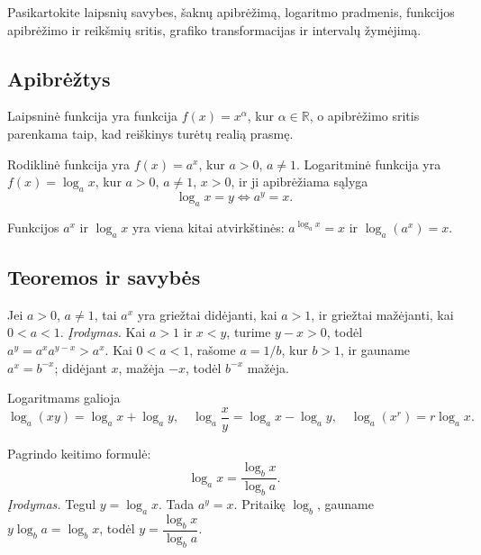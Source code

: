 \begin{tcolorbox}[title=Prieš pradedant, colback=green!5]
Pasikartokite laipsnių savybes, šaknų apibrėžimą, logaritmo pradmenis, funkcijos apibrėžimo ir reikšmių sritis, grafiko transformacijas ir intervalų žymėjimą.
\end{tcolorbox}
\subsection{Apibrėžtys}

\begin{apibreztis}
Laipsninė funkcija yra funkcija $f(x)=x^\alpha$, kur $\alpha\in\mathbb{R}$, o apibrėžimo sritis parenkama taip, kad reiškinys turėtų realią prasmę.
\end{apibreztis}

\begin{apibreztis}
Rodiklinė funkcija yra $f(x)=a^x$, kur $a>0$, $a\ne1$. Logaritminė funkcija yra $f(x)=\log_a x$, kur $a>0$, $a\ne1$, $x>0$, ir ji apibrėžiama sąlyga
\[
\log_a x=y \iff a^y=x.
\]
\end{apibreztis}

\begin{pastaba}
Funkcijos $a^x$ ir $\log_a x$ yra viena kitai atvirkštinės: $a^{\log_a x}=x$ ir $\log_a(a^x)=x$.
\end{pastaba}

\subsection{Teoremos ir savybės}

\begin{teorema}
Jei $a>0$, $a\ne1$, tai $a^x$ yra griežtai didėjanti, kai $a>1$, ir griežtai mažėjanti, kai $0<a<1$.
\emph{Įrodymas.} Kai $a>1$ ir $x<y$, turime $y-x>0$, todėl $a^{y}=a^x a^{y-x}>a^x$. Kai $0<a<1$, rašome $a=1/b$, kur $b>1$, ir gauname $a^x=b^{-x}$; didėjant $x$, mažėja $-x$, todėl $b^{-x}$ mažėja.
\end{teorema}

\begin{savybe}
Logaritmams galioja
\[
\log_a(xy)=\log_a x+\log_a y,\quad
\log_a\frac{x}{y}=\log_a x-\log_a y,\quad
\log_a(x^r)=r\log_a x.
\]
\end{savybe}

\begin{teorema}
Pagrindo keitimo formulė:
\[
\log_a x=\frac{\log_b x}{\log_b a}.
\]
\emph{Įrodymas.} Tegul $y=\log_a x$. Tada $a^y=x$. Pritaikę $\log_b$, gauname $y\log_b a=\log_b x$, todėl $y=\dfrac{\log_b x}{\log_b a}$.
\end{teorema}

